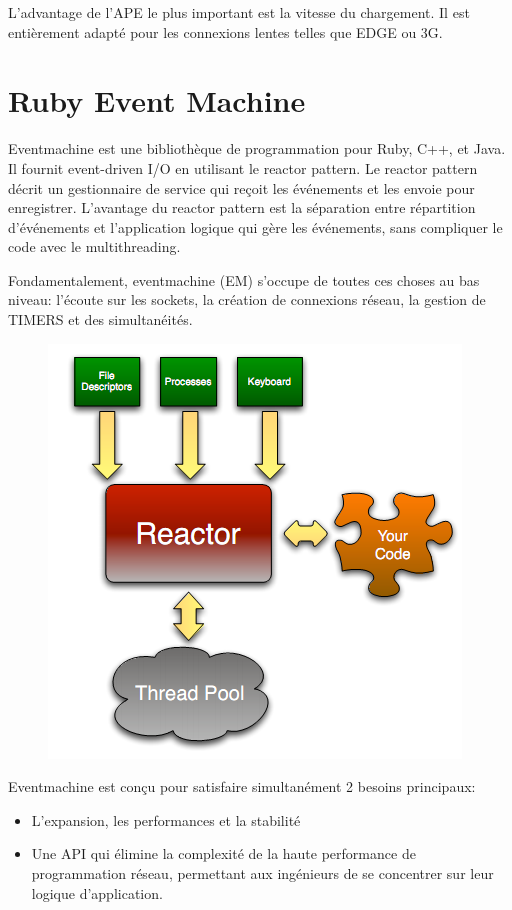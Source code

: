 \documentclass[a4paper,10pt]{report}
\begin{document}
L’advantage de l’APE le plus important est la vitesse du chargement. Il est entièrement adapté pour les connexions lentes telles que EDGE ou 3G.

  \section{Ruby Event Machine}
Eventmachine est une bibliothèque de programmation pour Ruby, C++, et Java. Il fournit event-driven I/O en utilisant le reactor pattern.  Le reactor pattern décrit un gestionnaire de service qui reçoit les événements et les envoie pour enregistrer. L’avantage du reactor pattern est la séparation entre répartition d’événements et l’application logique qui gère les événements, sans compliquer le code avec le multithreading.


Fondamentalement, eventmachine (EM) s'occupe de toutes ces choses au bas niveau: l'écoute sur les sockets, la création de connexions réseau, la gestion de TIMERS  et des simultanéités. 
  \begin{figure}[!ht]
    \centering
    \includegraphics[scale=0.7, bb=0 0 414 415]{img/RubyEM.png} 
  \end{figure}


Eventmachine est conçu pour satisfaire simultanément 2 besoins principaux:
\begin{itemize}
 \item L’expansion, les performances et la stabilité
 \item Une API qui élimine la complexité de la haute performance de programmation réseau, permettant aux ingénieurs de se concentrer sur leur logique d'application.
\end{itemize}
\end{document}
